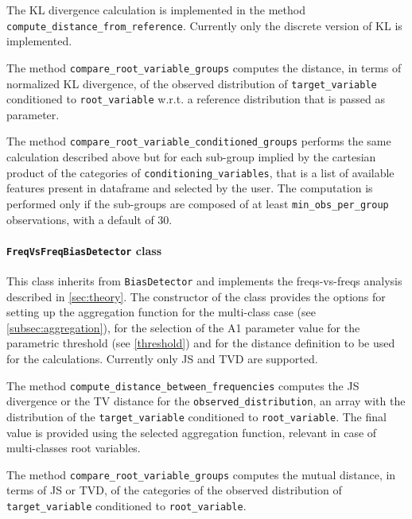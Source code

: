 \documentclass[
]{ceurart}
\begin{document}
The KL divergence calculation is implemented in the method \lstinline[columns=fixed]{compute_distance_from_reference}. Currently only the discrete version of KL is implemented. 

The method \lstinline[columns=fixed]{compare_root_variable_groups} computes the distance, in terms of normalized KL divergence, of the observed distribution of \lstinline[columns=fixed]{target_variable} conditioned to \lstinline[columns=fixed]{root_variable} w.r.t. a reference distribution that is passed as parameter.

The method \lstinline[columns=fixed]{compare_root_variable_conditioned_groups} performs the same calculation described above but for each sub-group implied by the cartesian product of the categories of \lstinline[columns=fixed]{conditioning_variables}, that is a list of available features present in dataframe and selected by the user. The computation is performed only if the sub-groups are composed of at least \lstinline[columns=fixed]{min_obs_per_group} observations, with a default of 30. 

\paragraph{\lstinline[columns=fixed]{FreqVsFreqBiasDetector} class}
This class inherits from \lstinline[columns=fixed]{BiasDetector} and implements the freqs-vs-freqs analysis described in \ref{sec:theory}. The constructor of the class provides the options for setting up the aggregation function for the multi-class case (see \ref{subsec:aggregation}), for the selection of the A1 parameter value for the parametric threshold (see \ref{threshold}) and for the distance definition to be used for the calculations. Currently only JS and TVD are supported. 

The method \lstinline[columns=fixed]{compute_distance_between_frequencies} computes the JS divergence or the TV distance for the \lstinline[columns=fixed]{observed_distribution}, an array with the distribution of the \lstinline[columns=fixed]{target_variable} conditioned to \lstinline[columns=fixed]{root_variable}. The final value is provided using the selected aggregation function, relevant in case of multi-classes root variables. 

The method \lstinline[columns=fixed]{compare_root_variable_groups} computes the mutual distance, in terms of JS or TVD, of the categories of the observed distribution of \lstinline[columns=fixed]{target_variable} conditioned to \lstinline[columns=fixed]{root_variable}.
\end{document}
